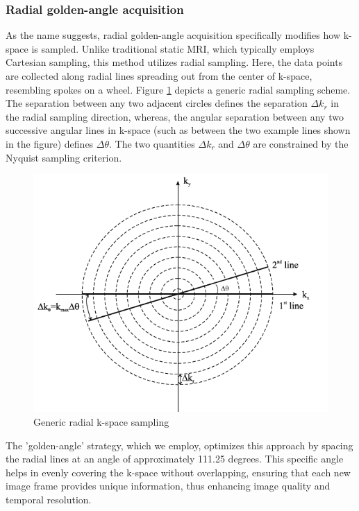 \documentclass{micro-econ-thesis}
\begin{document}
\subsubsection{Radial golden-angle acquisition}


As the name suggests, radial golden-angle acquisition specifically modifies how k-space is sampled. Unlike traditional static MRI, which typically employs Cartesian sampling, this method utilizes radial sampling. Here, the data points are collected along radial lines spreading out from the center of k-space, resembling spokes on a wheel. Figure \ref{fig:radial} depicts a generic radial sampling scheme. The separation between any two adjacent circles defines the separation $\Delta k_r$ in the radial sampling direction, whereas, the angular separation between any two successive angular lines in k-space (such as between the two example lines shown in the figure) defines $\Delta \theta$. The two quantities $\Delta k_r$ and $\Delta \theta$ are constrained by the Nyquist sampling criterion. \parencite{brown_magnetic_2014} 
  
 \begin{figure}[H]
 	\centering
 	\includegraphics[width=0.7\linewidth]{radial}
 	\caption{Generic radial k-space sampling \parencite[p.306]{brown_magnetic_2014}}
 	\label{fig:radial}
 \end{figure}
 
 The 'golden-angle' strategy, which we employ, optimizes this approach by spacing the radial lines at an angle of approximately 111.25 degrees. This specific angle helps in evenly covering the k-space without overlapping, ensuring that each new image frame provides unique information, thus enhancing image quality and temporal resolution. 
 
\end{document}
